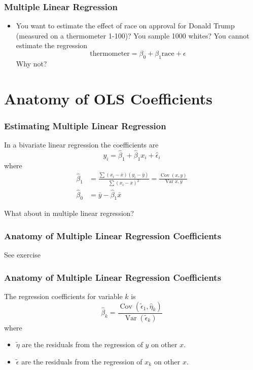 \documentclass{beamer}
\DeclareMathOperator{\cov}{Cov}
\DeclareMathOperator{\var}{Var}
\begin{document}
\begin{frame}
\frametitle{Multiple Linear Regression}
\begin{itemize}
\item You want to estimate the effect of race on approval for Donald Trump (measured on a thermometer 1-100)? You sample 1000 whites? You cannot estimate the regression 
  \begin{equation*}
  \text{thermometer} = \beta_0 + \beta_1 \text{race} + \epsilon
  \end{equation*}
  Why not?
\end{itemize}
\end{frame}

\section{Anatomy of OLS Coefficients}

\begin{frame}
\frametitle{Estimating Multiple Linear Regression}

  In a bivariate linear regression the coefficients are
  \begin{equation*}
  y_i = \hat\beta_1 + \hat\beta_1 x_i + \hat\epsilon_i
  \end{equation*}
  where
  \begin{align*}
  \hat\beta_1 &= \frac{\sum (x_i - \bar{x}) (y_i - \bar{y})}{\sum (x_i - \bar{x})^2} = \frac{\cov(x, y)}{\var{x, y}} \\
  \hat\beta_0 &= \bar{y} - \hat{\beta}_1 \bar{x}
  \end{align*}
  
  What about in multiple linear regression?

\end{frame}

\begin{frame}
\frametitle{Anatomy of Multiple Linear Regression Coefficients}

See exercise

\end{frame}

\begin{frame}
\frametitle{Anatomy of Multiple Linear Regression Coefficients}

The regression coefficients for variable $k$ is
\begin{equation*}
\hat{\beta}_k = \frac{\cov(\tilde{\epsilon}_1, \hat{\eta}_k)}{\var(\tilde{\epsilon}_k)}
\end{equation*}
where
\begin{itemize}
\item $\tilde{\eta}$ are the residuals from the regression of $y$ on other $x$.
\item $\tilde{\epsilon}$ are the residuals from the regression of $x_k$ on other $x$.
\end{itemize}


\end{frame}
\end{document}
